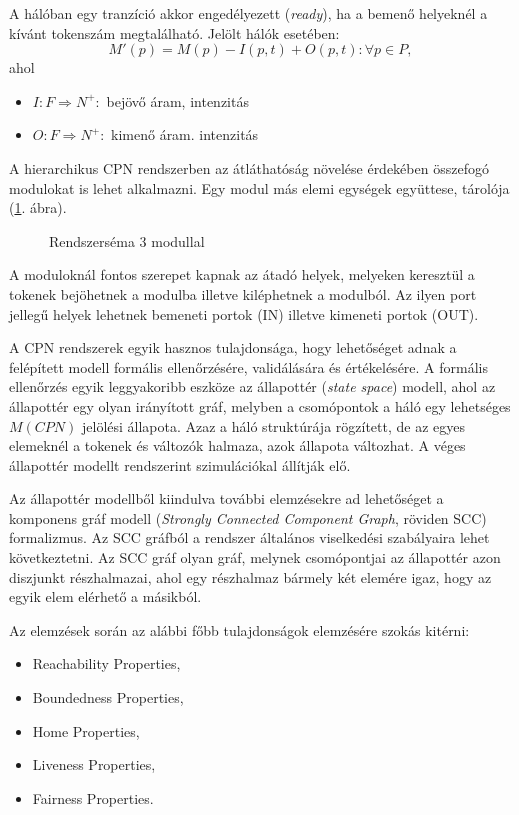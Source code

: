 A hálóban egy tranzíció akkor engedélyezett (\textit{ready}), ha a bemenő helyeknél a kívánt tokenszám megtalálható.
Jelölt hálók esetében:
\[
M'(p)=M(p)-I(p,t)+O(p,t): \forall p\in P,
\]
ahol 
\begin{itemize}
\item $I:F\Rightarrow N^+:$  bejövő áram, intenzitás
\item $O:F\Rightarrow N^+:$ kimenő áram. intenzitás
\end{itemize}

A hierarchikus CPN rendszerben az átláthatóság növelése érdekében összefogó modulokat is lehet alkalmazni. Egy modul más elemi egységek együttese, tárolója (\ref{fig:schema}. ábra).

\begin{figure}[h!]
\centering
\caption{Rendszerséma 3 modullal}
\label{fig:schema}
\end{figure}

A moduloknál fontos szerepet kapnak az átadó helyek, melyeken keresztül a tokenek bejöhetnek a modulba illetve kiléphetnek a modulból. Az ilyen port jellegű helyek lehetnek bemeneti portok (IN) illetve kimeneti portok (OUT).  

A CPN rendszerek egyik hasznos tulajdonsága, hogy lehetőséget adnak a felépített modell formális ellenőrzésére, validálására és értékelésére. A formális ellenőrzés egyik leggyakoribb eszköze az állapottér (\textit{state space})  modell, ahol az állapottér egy olyan irányított gráf, melyben a csomópontok a háló egy lehetséges  $M(CPN)$ jelölési állapota. Azaz a háló struktúrája rögzített, de az egyes elemeknél a tokenek és változók halmaza, azok állapota változhat. A véges állapottér modellt rendszerint szimulációkal állítják elő. 

Az állapottér modellből kiindulva további elemzésekre ad lehetőséget a komponens gráf modell (\textit{Strongly Connected Component Graph}, röviden SCC) formalizmus. Az SCC gráfból a rendszer általános viselkedési szabályaira lehet következtetni. Az SCC gráf olyan gráf, melynek csomópontjai az állapottér azon diszjunkt részhalmazai, ahol egy részhalmaz bármely két elemére igaz, hogy az egyik elem  elérhető a másikból. 

Az elemzések során az alábbi főbb tulajdonságok elemzésére szokás kitérni:
\begin{itemize}
\item Reachability Properties,
\item Boundedness Properties,
\item Home Properties,
\item Liveness Properties,
\item Fairness Properties.
\end{itemize}

